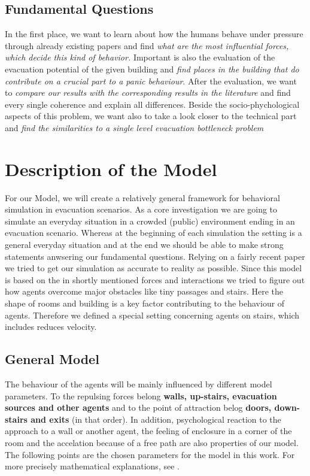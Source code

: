 \documentclass[11pt]{article}
\begin{document}
\subsection{Fundamental Questions}

In the first place, we want to learn about how the humans behave under pressure through already existing papers \cite{AACIBF} \cite{ACPPD}  \cite{SDFEP} \cite{DCD} and find \textit{ what are the most influential forces, which decide this kind of behavior.} Important is also the evaluation of the evacuation potential of the given building and \textit{find places in the building that do contribute on a crucial part to a panic behaviour}.  After the evaluation, we want to \textit{compare our results with the corresponding results in the literature} and find every single coherence and explain all differences. Beside the socio-phychological aspects of this problem, we want also to take a look closer to the technical part and \textit{find the similarities to a single level evacuation bottleneck problem}


\section{Description of the Model}

For our Model, we will create a relatively general framework for behavioral simulation in evacuation scenarios. As a core investigation we are going to simulate an everyday situation in a crowded (public) environment ending in an evacuation scenario. Whereas at the beginning of each simulation the setting is a general everyday situation and at the end we should be able to make strong statements anwsering our fundamental questions. Relying on a fairly recent paper \cite{SDFEP} we tried to get our simulation as accurate to reality as possible. Since this model is based on the in shortly mentioned forces and interactions we tried to figure out how agents overcome major obstacles like tiny passages and stairs. Here the shape of rooms and building is a key factor contributing to the behaviour of agents. Therefore we defined a special setting concerning agents on stairs, which includes reduces velocity.



\subsection{General Model}

The behaviour of the agents will be mainly influenced by different model parameters. To the repulsing forces belong \textbf{walls, up-stairs, evacuation sources and other agents} and to the point of attraction belog \textbf{doors, down-stairs and exits} (in that order). In addition, psychological reaction to the approach to a wall or another agent, the feeling of enclosure in a corner of the room and the accelation because of a free path are also properties of our model. The following points are the chosen parameters for the model in this work. For more precisely mathematical explanations, see \cite{SFMPD}.
\end{document}
